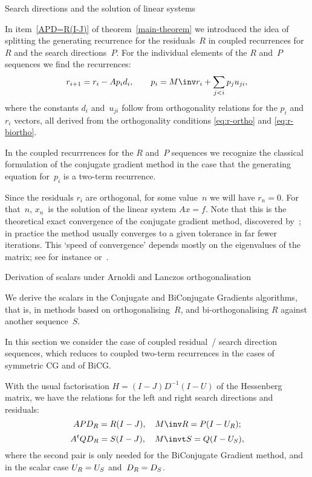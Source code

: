 \documentclass[11pt]{artikel3}
\begin{document}
\begin{Outline}
 {Search directions and the solution of linear systems}
\label{coupled:recur}\label{update:relation}

In item~\ref{APD=R(I-J)} of theorem~\ref{main-theorem} we introduced
the idea of splitting the generating recurrence for the residuals~$R$
in coupled recurrences for $R$ and the search directions~$P$.
For the individual elements of the $R$ and~$P$ sequences we
find the recurrences:
\[ r_{i+1}=r_i-Ap_id_i,\qquad p_i=M\inv r_i+\sum_{j<i}p_ju_{ji},\]
where
the constants $d_i$ and~$u_{ji}$ follow from orthogonality relations
for the $p_i$ and~$r_i$ vectors, all derived from the orthogonality
conditions \eqref{eq:r-ortho} and \eqref{eq:r-biortho}.

In the coupled recurrrences for the $R$ and~$P$ sequences we recognize
the classical formulation of the conjugate gradient method in the case
that the generating equation for~$p_i$ is a two-term recurrence.

Since the residuals $r_i$ are
orthogonal, for some value~$n$ we will have $r_n=0$. For that~$n$,
$x_n$~is the solution of the linear system $Ax=f$. Note that this is
the theoretical exact convergence of the conjugate gradient method,
discovered by~\cite{HestenesStiefel1952:cg};
in practice the method usually converges
to a given tolerance in far fewer iterations. This `speed of
convergence' depends mostly on the eigenvalues of the matrix;
see for instance \cite{AxLi:convergencerate}
or~\cite{vdSlvdVo:rateofconvergence}.

 {Derivation of scalars under Arnoldi and Lanczos orthogonalisation}
\label{sec:scalars-nonsymm}
\label{sec:pr-ortho}

We derive the scalars in the Conjugate and BiConjugate Gradients algorithms,
that is, in methods based on orthogonalising~$R$,
and bi-orthogonalising $R$ against another sequence~$S$.

In this section we consider the case of coupled residual~/ search direction
sequences, which reduces to coupled two-term recurrences
in the cases of symmetric CG and of BiCG.

With the usual factorisation $H=(I-J)D^{-1}(I-U)$ of the Hessenberg matrix,
we have the relations
for the left and right search directions and residuals:
\[ A PD_R=R(I-J),\quad M\inv R=P(I-U_R);\]
\[ A^t QD_R=S(I-J),\quad M\invt S=Q(I-U_S), \]
where the second pair is only needed for the BiConjugate Gradient method,
and in the scalar case $U_R=\nobreak U_S$ and~$D_R=\nobreak D_S$.


\end{Outline}
\end{document}
